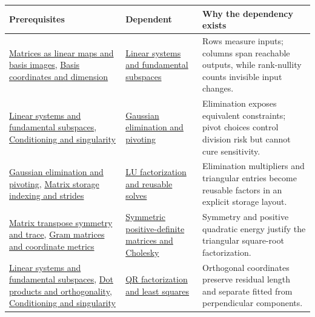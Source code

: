 {\def\LTcaptype{none} %
\begin{longtable}[]{@{}
  >{\raggedright\arraybackslash}p{}
  >{\raggedright\arraybackslash}p{}
  >{\raggedright\arraybackslash}p{}@{}}
\toprule\noalign{}
\begin{minipage}[b]{\linewidth}\raggedright
Prerequisites
\end{minipage} & \begin{minipage}[b]{\linewidth}\raggedright
Dependent
\end{minipage} & \begin{minipage}[b]{\linewidth}\raggedright
Why the dependency exists
\end{minipage} \\
\midrule\noalign{}
\endhead
\bottomrule\noalign{}
\endlastfoot
\hyperref[appendix-bd39c3bf5d64]{Matrices as linear maps and basis images}, \hyperref[appendix-ce0341f7ea0d]{Basis coordinates and dimension} & \hyperref[appendix-8572a4a060c1]{Linear systems and fundamental subspaces} & Rows measure inputs; columns span reachable outputs, while rank-nullity counts invisible input changes. \\
\hyperref[appendix-8572a4a060c1]{Linear systems and fundamental subspaces}, \hyperref[appendix-8f6a01f284a7]{Conditioning and singularity} & \hyperref[appendix-f6e77f4a200f]{Gaussian elimination and pivoting} & Elimination exposes equivalent constraints; pivot choices control division risk but cannot cure sensitivity. \\
\hyperref[appendix-f6e77f4a200f]{Gaussian elimination and pivoting}, \hyperref[appendix-ffdc1d4e5350]{Matrix storage indexing and strides} & \hyperref[appendix-55e4b5b0a1e6]{LU factorization and reusable solves} & Elimination multipliers and triangular entries become reusable factors in an explicit storage layout. \\
\hyperref[appendix-175ca5ff874d]{Matrix transpose symmetry and trace}, \hyperref[appendix-3b863809f82a]{Gram matrices and coordinate metrics} & \hyperref[appendix-50d2ea3c9b26]{Symmetric positive-definite matrices and Cholesky} & Symmetry and positive quadratic energy justify the triangular square-root factorization. \\
\hyperref[appendix-8572a4a060c1]{Linear systems and fundamental subspaces}, \hyperref[appendix-8bc4e8fc547c]{Dot products and orthogonality}, \hyperref[appendix-8f6a01f284a7]{Conditioning and singularity} & \hyperref[appendix-c3421e6b4f2c]{QR factorization and least squares} & Orthogonal coordinates preserve residual length and separate fitted from perpendicular components. \\

\end{longtable}}
